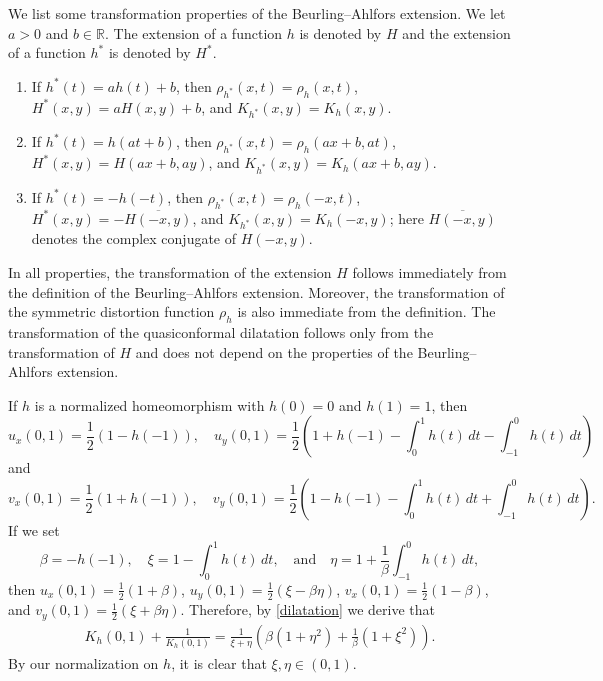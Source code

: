 \documentclass{amsart}
\theoremstyle{plain}
\theoremstyle{definition}
\theoremstyle{remark}
\numberwithin{equation}{section}
\numberwithin{theorem}{section}
\numberwithin{conjecture}{section}
\newcommand{\br}{\overline}
\newcommand{\R}{\mathbb R}
\newcommand{\1}{\mathbf 1}
\begin{document}
We list some transformation properties of the Beurling--Ahlfors extension. We let $a>0$ and $b\in \R$. The extension of a function $h$ is denoted by $H$ and the extension of a function $h^*$ is denoted by $H^*$.
\begin{enumerate}[label={(BA\arabic*)}]
	\item\label{p1} If $h^*(t)=ah(t)+b$, then $\rho_{h^*}(x,t)=\rho_h(x,t)$, $H^*(x,y)=aH(x,y)+b$, and $K_{h^*}(x,y)=K_h(x,y)$.
	\item\label{p2} If $h^*(t)=h(at+b)$, then $\rho_{h^*}(x,t)=\rho_h(ax+b,at)$, $H^*(x,y)=H(ax+b,ay)$, and $K_{h^*}(x,y)=K_h(ax+b,ay)$.
	\item\label{p3} If $h^*(t)=-h(-t)$, then $\rho_{h^*}(x,t)=\rho_h(-x,t)$, $H^*(x,y)=-\br{H(-x,y)}$, and $K_{h^*}(x,y)=K_h(-x,y)$; here $\br{H(-x,y)}$ denotes the complex conjugate of $H(-x,y)$.
\end{enumerate}
In all properties, the transformation of the extension $H$ follows immediately from the definition of the Beurling--Ahlfors extension. Moreover, the transformation of the symmetric distortion function $\rho_h$ is also immediate from the definition. The transformation of the quasiconformal dilatation follows only from the transformation of $H$ and does not depend on the properties of the Beurling--Ahlfors extension. 


If $h$ is a normalized homeomorphism with $h(0)=0$ and $h(1)=1$, then
\[u_x(0,1)=\frac{1}{2}(1-h(-1)),\quad u_y(0,1)=\frac{1}{2}\left(1+h(-1)-\int_0^1 h(t)\,dt-\int_{-1}^0 h(t)\,dt\right)\]
and
\[v_x(0,1)=\frac{1}{2}(1+h(-1)),\quad v_y(0,1)=\frac{1}{2}\left(1-h(-1)-\int_0^1 h(t)\,dt+\int_{-1}^0 h(t)\,dt\right).\]
If we set 
\[\beta=-h(-1),\quad \xi=1-\int_0^1 h(t)\,dt,\quad \textrm{and}\quad \eta=1+\frac{1}{\beta}\int_{-1}^0 h(t)\,dt,\]
then $u_x(0,1)=\frac{1}{2}(1+\beta)$, $u_y(0,1)=\frac{1}{2}(\xi-\beta\eta)$, $v_x(0,1)=\frac{1}{2}(1-\beta)$, and $v_y(0,1)=\frac{1}{2}(\xi+\beta\eta)$.
Therefore, by \eqref{dilatation} we derive that
\begin{align}\label{dilatationxieta}
K_{h}(0,1)+\frac{1}{K_{h}(0,1)}=\frac{1}{\xi+\eta}\left(\beta(1+\eta^2)+\frac{1}{\beta}(1+\xi^2)\right).
\end{align}
By our normalization on $h$, it is clear that $\xi,\eta\in (0,1)$.
\end{document}
